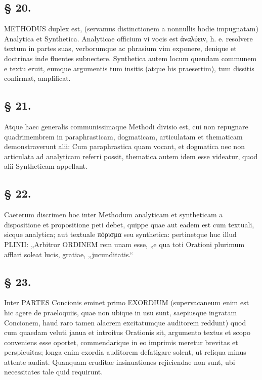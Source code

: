 \subsection*{§ 20.}

METHODUS duplex est, (servamus distinctionem a nonnullis hodie impugnatam) Analytica et Synthetica. Analyticae officium vi vocis est ἀναλύειν, h. e. resolvere textum in partes suas, verborumque ac phrasium vim exponere, denique et doctrinas inde fluentes subnectere. Synthetica autem locum quendam communem e textu eruit, eumque argumentis tum insitis (atque his praesertim), tum dissitis confirmat, amplificat.

\subsection*{§ 21.}

Atque haec generalis communissimaque Methodi divisio est, cui non repugnare quadrimembrem in paraphrasticam, dogmaticam, articulatam et thematicam demonstraverunt alii: Cum paraphrastica quam vocant, et dogmatica nec non articulata ad analyticam referri possit, thematica autem idem esse videatur, quod alii Syntheticam appellant.

\subsection*{§ 22.}

Caeterum discrimen hoc inter Methodum analyticam et syntheticam a dispositione et propositione peti debet, quippe quae aut eadem est cum textuali, sicque analytica; aut textuale πόρισμα seu synthetica: pertinetque huc illud PLINII: „Arbitror ORDINEM rem unam esse, „e qua toti Orationi plurimum afflari soleat lucis, gratiae, „jucunditatis.“

\subsection*{§ 23.}

Inter PARTES Concionis eminet primo EXORDIUM (supervacaneum enim est hic agere de praeloquiis, quae non ubique in usu sunt, saepiusque ingratam Concionem, haud raro tamen alacrem excitatumque auditorem reddunt) quod cum quaedam veluti janua et introitus Orationis sit, argumento textus et scopo conveniens esse oportet, commendarique in eo imprimis meretur brevitas et perspicuitas; longa enim exordia auditorem defatigare solent, ut reliqua minus attente audiat. Quanquam eruditae insinuationes rejiciendae non sunt, ubi necessitates tale quid requirunt.

